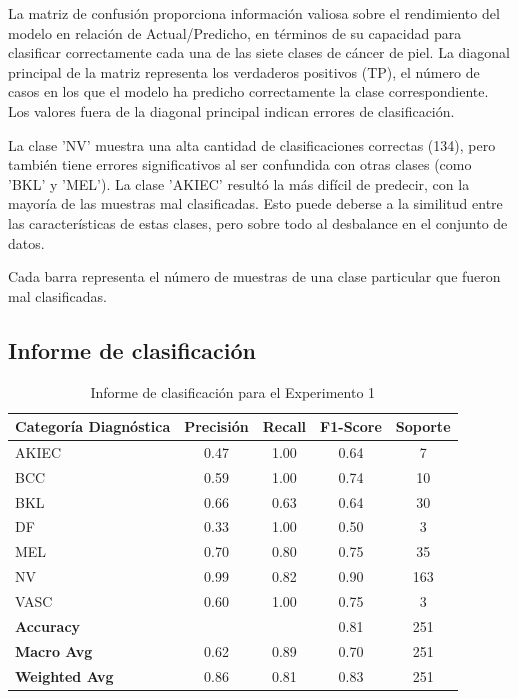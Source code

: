 La matriz de confusión proporciona información valiosa sobre el rendimiento del modelo en relación de Actual/Predicho, en términos de su capacidad para clasificar correctamente cada una de las siete clases de cáncer de piel. La diagonal principal de la matriz representa los verdaderos positivos (TP), el número de casos en los que el modelo ha predicho correctamente la clase correspondiente. Los valores fuera de la diagonal principal indican errores de clasificación.

    La clase 'NV' muestra una alta cantidad de clasificaciones correctas (134), pero también tiene errores significativos al ser confundida con otras clases (como 'BKL' y 'MEL'). La clase 'AKIEC' resultó la más difícil de predecir, con la mayoría de las muestras mal clasificadas. Esto puede deberse a la similitud entre las características de estas clases, pero sobre todo al desbalance en el conjunto de datos.
    
    Cada barra representa el número de muestras de una clase particular que fueron mal clasificadas.

\subsection*{Informe de clasificación}

\begin{table}[ht]
    \centering
    \caption{Informe de clasificación para el Experimento 1}
    \label{tab:classification_report_exp1}
    \begin{tabular}{lcccc}
    \hline
    \textbf{Categoría Diagnóstica} & \textbf{Precisión} & \textbf{Recall} & \textbf{F1-Score} & \textbf{Soporte} \\
    \hline
    AKIEC & 0.47 & 1.00 & 0.64 & 7 \\
    BCC   & 0.59 & 1.00 & 0.74 & 10 \\
    BKL   & 0.66 & 0.63 & 0.64 & 30 \\
    DF    & 0.33 & 1.00 & 0.50 & 3 \\
    MEL   & 0.70 & 0.80 & 0.75 & 35 \\
    NV    & 0.99 & 0.82 & 0.90 & 163 \\
    VASC  & 0.60 & 1.00 & 0.75 & 3 \\
    \hline
    \textbf{Accuracy} & & & 0.81 & 251 \\
    \textbf{Macro Avg} & 0.62 & 0.89 & 0.70 & 251 \\
    \textbf{Weighted Avg} & 0.86 & 0.81 & 0.83 & 251 \\
    \hline
    \end{tabular}
    \end{table}

